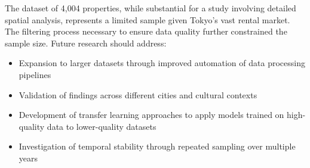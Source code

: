 The dataset of 4,004 properties, while substantial for a study involving detailed spatial analysis, 
represents a limited sample given Tokyo's vast rental market. The filtering process necessary to 
ensure data quality further constrained the sample size. Future research should address:

\begin{itemize}
    \item Expansion to larger datasets through improved automation of data processing pipelines
    \item Validation of findings across different cities and cultural contexts
    \item Development of transfer learning approaches to apply models trained on high-quality data to 
    lower-quality datasets
    \item Investigation of temporal stability through repeated sampling over multiple years
\end{itemize}






